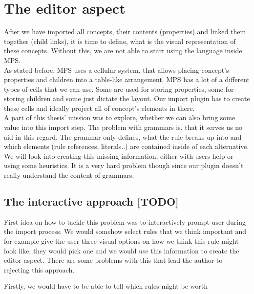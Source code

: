 \section{The editor aspect}
\label{chap:editor_aspect}
After we have imported all concepts, their contents (properties) and linked them together (child links), it is time to define, what is the visual representation of these concepts.
Without this, we are not able to start using the language inside MPS.
\\

As stated before, MPS uses a cellular system, that allows placing concept's properties and children into a table-like arrangement.
MPS has a lot of a different types of cells that we can use.
Some are used for storing properties, some for storing children and some just dictate the layout.
Our import plugin has to create these cells and ideally project all of concept's elements in there.
\\

A part of this thesis' mission was to explore, whether we can also bring some value into this import step.
The problem with grammars is, that it serves us no aid in this regard.
The grammar only defines, what the rule breaks up into and which elements (rule references, literals..) are contained inside of each alternative.
We will look into creating this missing information, either with users help or using some heuristics.
It is a very hard problem though since our plugin doesn't really understand the content of grammars.

\subsection{The interactive approach [TODO]}
First idea on how to tackle this problem was to interactively prompt user during the import process. We would somehow select rules that we think important and for example give the user three visual options on how we think this rule might look like, they would pick one and we would use this information to create the editor aspect. There are some problems with this that lead the author to rejecting this approach.

Firstly, we would have to be able to tell which rules might be worth